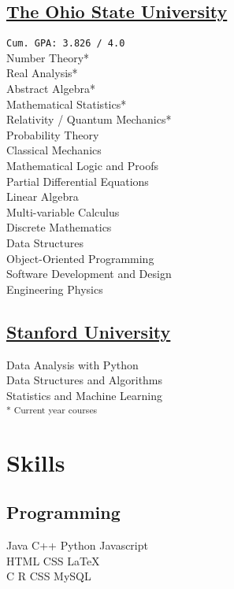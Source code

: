 \documentclass[]{farhan-resume-openfont}
\begin{document}
\begin{minipage}[t]{0.25\textwidth}
    \subsection{\href{https://www.osu.edu/}{The Ohio State University}}
    \texttt{Cum. GPA: 3.826 / 4.0} \\
    Number Theory* \\
    Real Analysis* \\
    Abstract Algebra* \\
    Mathematical Statistics* \\
    Relativity / Quantum Mechanics* \\
    Probability Theory \\
    Classical Mechanics \\
    Mathematical Logic and Proofs \\
    Partial Differential Equations \\
    Linear Algebra\\
    Multi-variable Calculus\\
    Discrete Mathematics\\
    Data Structures \\
    Object-Oriented Programming\\
    Software Development and Design\\
    Engineering Physics\\

    \sectionsep
    \subsection{\href{https://stanford.edu/}{Stanford University}}
    Data Analysis with Python \\
    Data Structures and Algorithms\\
    Statistics and Machine Learning \\

    \textsubscript{* Current year courses}


    \section{Skills}
    \subsection{Programming}
    Java \textbullet{}   C++ \textbullet{} Python \textbullet{} Javascript \\
    HTML \textbullet{} CSS \textbullet \LaTeX \\
    C \textbullet{} R \textbullet{} CSS \textbullet{} \textbullet{} MySQL \\
    \vspace{1em}

\end{minipage}
\end{document}
